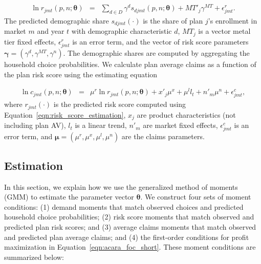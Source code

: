 \documentclass[12pt]{article}
\begin{document}
\vspace{-0.4in}
\begin{eqnarray}
\label{eqn:risk_score_estimation}
	\ln r_{jmt}(\textit{p},\textit{n};\boldsymbol{\theta}) &=& \sum_{d \in D} \gamma^d s_{djmt}(\textit{p},\textit{n};\boldsymbol{\theta}) + MT'_j \gamma^{MT} + \epsilon_{jmt}^r.
\end{eqnarray}
The predicted demographic share $s_{djmt}(\cdot)$ is the share of plan $j$'s enrollment in market $m$ and year $t$ with demographic characteristic $d$, $MT_j$ is a vector metal tier fixed effects,  $\epsilon_{jmt}^r$ is an error term, and the vector of risk score parameters $\boldsymbol{\gamma} = (\gamma^d,\gamma^{MT},\gamma^{n})$. The demographic shares are computed by aggregating the household choice probabilities.   We calculate plan average claims as a function of the plan risk score using the estimating equation 

\vspace{-0.4in}	
\begin{eqnarray}
\label{eqn:avg_claims_estimation}
	\ln c_{jmt}(\textit{p},\textit{n};\boldsymbol{\theta}) &=& \mu^r \ln r_{jmt}(\textit{p},\textit{n};\boldsymbol{\theta}) + x'_j  \mu^{x}  + \mu^l l_t +   n'_m \mu^{n} + \epsilon_{jmt}^c,
\end{eqnarray}
where $r_{jmt}(\cdot)$ is the predicted risk score computed using Equation~\eqref{eqn:risk_score_estimation}, $x_j$ are product characteristics (not including plan AV), $l_t$ is a linear trend, $n'_m$ are market fixed effects, $\epsilon_{jmt}^c$ is an error term, and  $\boldsymbol{\mu} = (\mu^r,\mu^x,\mu^l,\mu^n)$ are the claims parameters. 

\subsection{Estimation}
\label{subsec:steering-methods}

In this section, we explain how we use the generalized method of moments (GMM) to estimate the parameter vector $\boldsymbol{\theta}$.  We construct four sets of moment conditions: (1) demand moments that match observed choices and predicted household choice probabilities; (2) risk score moments that match observed and predicted plan risk scores; and (3) average claims moments that match observed and predicted plan average claims; and (4) the first-order conditions for profit maximization in Equation~\eqref{eqn:acara_foc_short}. These moment conditions are summarized below:
\end{document}

